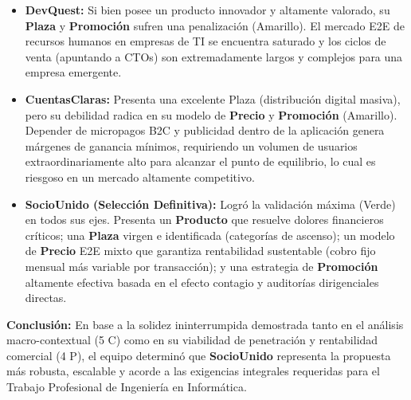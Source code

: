 \begin{itemize}
    \item \textbf{DevQuest:} Si bien posee un producto innovador y altamente valorado, su \textbf{Plaza} y \textbf{Promoción} sufren una penalización (\colorbox{yellow!50}{Amarillo}). El mercado E2E de recursos humanos en empresas de TI se encuentra saturado y los ciclos de venta (apuntando a CTOs) son extremadamente largos y complejos para una empresa emergente.
    \item \textbf{CuentasClaras:} Presenta una excelente Plaza (distribución digital masiva), pero su debilidad radica en su modelo de \textbf{Precio} y \textbf{Promoción} (\colorbox{yellow!50}{Amarillo}). Depender de micropagos B2C y publicidad dentro de la aplicación genera márgenes de ganancia mínimos, requiriendo un volumen de usuarios extraordinariamente alto para alcanzar el punto de equilibrio, lo cual es riesgoso en un mercado altamente competitivo.
    \item \textbf{SocioUnido (Selección Definitiva):} Logró la validación máxima (\colorbox{green!50}{Verde}) en todos sus ejes. Presenta un \textbf{Producto} que resuelve dolores financieros críticos; una \textbf{Plaza} virgen e identificada (categorías de ascenso); un modelo de \textbf{Precio} E2E mixto que garantiza rentabilidad sustentable (cobro fijo mensual más variable por transacción); y una estrategia de \textbf{Promoción} altamente efectiva basada en el efecto contagio y auditorías dirigenciales directas.
\end{itemize}

\textbf{Conclusión:} En base a la solidez ininterrumpida demostrada tanto en el análisis macro-contextual (5 C) como en su viabilidad de penetración y rentabilidad comercial (4 P), el equipo determinó que \textbf{SocioUnido} representa la propuesta más robusta, escalable y acorde a las exigencias integrales requeridas para el Trabajo Profesional de Ingeniería en Informática.
